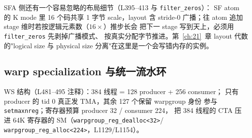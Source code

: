 SFA 侧还有一个容易忽略的布局细节（L395--413 与 \texttt{filter\_zeros}）：
SF atom 的 K mode 里 16 个码共享 1 字节 scale，layout 含 stride-0
广播；往 atom 追加 stage 维时若按逻辑元素数（$16\times$）推步长会
把下一 stage 写到天上，必须用 \texttt{filter\_zeros} 先剥掉广播模式、
按真实分配字节推进。第~\ref{ch:21}~章 layout 代数的"logical size
与 physical size 分离"在这里是一个会写错内存的实例。

\subsection{warp specialization 与统一流水环}\label{sec:40-ws}

WS 结构（L481--495 注释）：384 线程 = 128 producer + 256 consumer；
只有 producer 的 tid 0 真正发 TMA，其余 127 个保留 warpgroup 身份
参与 \texttt{setmaxnreg}；寄存器预算 producer 32 / consumer 224，
把 384 线程的 CTA 压进 64K 寄存器的 SM（\texttt{warpgroup\_reg\_dealloc<32>}/
\texttt{warpgroup\_reg\_alloc<224>}，L1129/L1154）。

